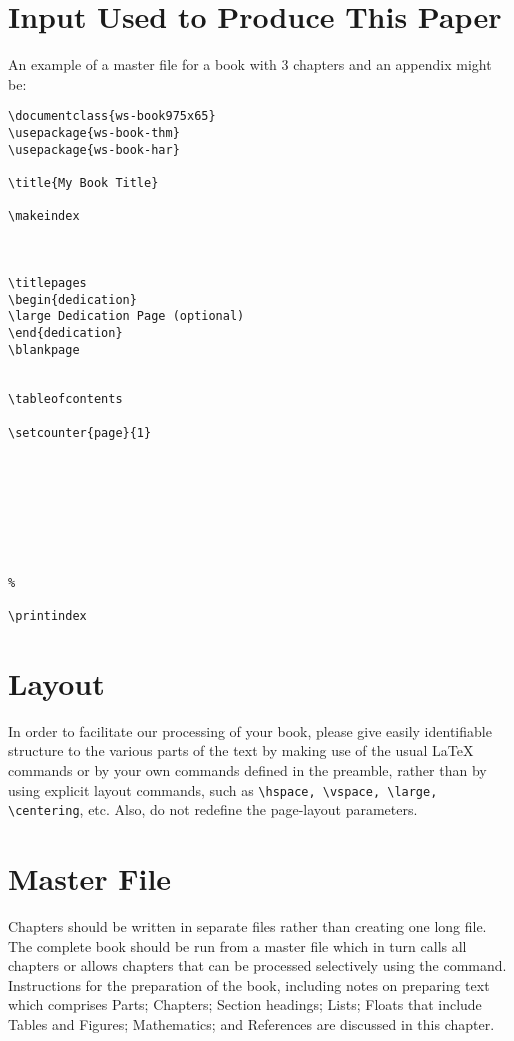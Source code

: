 \section{Input Used to Produce This Paper}
An example of a master file for a book with 3 chapters and an
appendix might be:

\begin{verbatim}
\documentclass{ws-book975x65}
\usepackage{ws-book-thm}
\usepackage{ws-book-har}

\title{My Book Title}

\makeindex



\titlepages
\begin{dedication}
\large Dedication Page (optional)
\end{dedication}
\blankpage


\tableofcontents

\setcounter{page}{1}








%

\printindex

\end{verbatim}

\section{Layout}
In order to facilitate our processing of your book, please give
easily identifiable structure to the various parts of the text by
making use of the usual \LaTeX{} commands or by your own commands
defined in the preamble, rather than by using explicit layout
commands, such as \verb|\hspace, \vspace, \large, \centering|, etc.
Also, do not redefine the page-layout parameters.

\section{Master File}
Chapters should be written in separate files rather than creating
one long file. The complete book should be run from a master
file which in turn calls all chapters or allows
chapters that can be processed selectively using the \verb||
command. Instructions for the preparation of the book, including
notes on preparing text which comprises Parts; Chapters; Section
headings; Lists; Floats that include Tables and Figures;
Mathematics; and References are discussed in this chapter.


